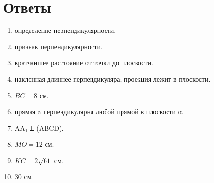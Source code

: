 \documentclass{umk-matematika}
\begin{document}
\newpage
\section*{Ответы}

\begin{enumerate}
  \item определение перпендикулярности.
  \item признак перпендикулярности.
  \item кратчайшее расстояние от точки до плоскости.
  \item наклонная длиннее перпендикуляра; проекция лежит в плоскости.
  \item $BC = 8$ см.
  \item прямая a перпендикулярна любой прямой в плоскости α.
  \item AA₁ ⟂ (ABCD).
  \item $MO = 12$ см.
  \item $KC = 2\sqrt{61}$ см.
  \item 30 см.
\end{enumerate}
\end{document}
